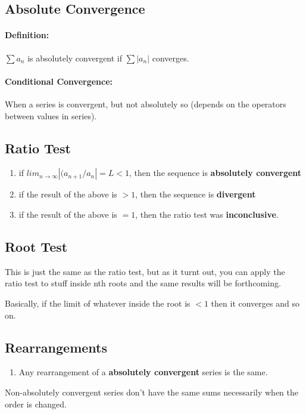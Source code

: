 \documentclass[a4paper,12pt]{report}
\begin{document}
\subsection{Absolute Convergence}
\paragraph{Definition: } $\sum a_n$ is absolutely convergent if $\sum |a_n|$ converges.

\paragraph{Conditional Convergence: } When a series is convergent, but not absolutely so (depends on the operators between values in series).

\subsection{Ratio Test}
\begin{enumerate}
\item if $lim_{n\to\infty} |(a_{n+1}/a_n| = L < 1$, then the sequence is \textbf{absolutely convergent}
\item if the result of the above is $> 1$, then the sequence is \textbf{divergent}
\item if the result of the above is $= 1$, then the ratio test was \textbf{inconclusive}.
\end{enumerate}

\subsection{Root Test}
This is just the same as the ratio test, but as it turnt out, you can apply the ratio test to stuff inside nth roots and the same results will be forthcoming. 


Basically, if the limit of whatever inside the root is $<1$ then it converges and so on.

\subsection{Rearrangements}
\begin{enumerate}
\item Any rearrangement of a \textbf{absolutely convergent} series is the same.
\end{enumerate}

Non-absolutely convergent series don't have the same sums necessarily when the order is changed. 
\end{document}
